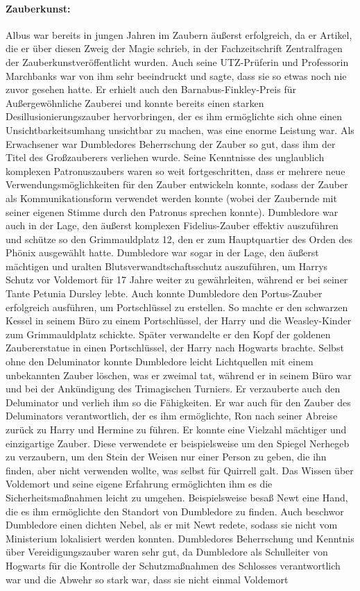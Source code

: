 \documentclass[a4paper, 10pt]{article}
\begin{document}
\paragraph{Zauberkunst:}
Albus war bereits in jungen Jahren im Zaubern äußerst erfolgreich, da er Artikel, die er über diesen Zweig der Magie schrieb, in der Fachzeitschrift Zentralfragen der Zauberkunstveröffentlicht wurden. Auch seine UTZ-Prüferin und Professorin Marchbanks war von ihm sehr beeindruckt und sagte, dass sie so etwas noch nie zuvor gesehen hatte. Er erhielt
auch den Barnabus-Finkley-Preis für Außergewöhnliche Zauberei und konnte bereits einen starken Desillusionierungszauber hervorbringen, der es ihm ermöglichte sich ohne einen Unsichtbarkeitsumhang unsichtbar zu machen, was eine enorme Leistung war. Als Erwachsener war Dumbledores Beherrschung der Zauber so gut, dass ihm der Titel des Großzauberers verliehen wurde. Seine Kenntnisse des unglaublich komplexen Patronuszaubers waren so weit fortgeschritten, dass er mehrere neue Verwendungsmöglichkeiten für den Zauber entwickeln konnte, sodass der Zauber als Kommunikationsform verwendet werden konnte (wobei der Zaubernde mit seiner eigenen Stimme durch den Patronus sprechen konnte). Dumbledore war auch in der Lage, den äußerst komplexen Fidelius-Zauber effektiv auszuführen und schütze so den Grimmauldplatz 12, den er zum Hauptquartier des Orden des Phönix ausgewählt hatte. Dumbledore war sogar in der Lage, den äußerst mächtigen und uralten Blutsverwandtschaftsschutz auszuführen, um Harrys Schutz vor Voldemort für 17 Jahre weiter zu gewährleiten, während er bei seiner Tante Petunia Dursley lebte. Auch konnte Dumbledore den Portus-Zauber erfolgreich ausführen, um Portschlüssel zu erstellen. So machte er den schwarzen Kessel in seinem Büro zu einem Portschlüssel, der Harry und die Weasley-Kinder zum Grimmauldplatz schickte. Später verwandelte er den Kopf der goldenen Zaubererstatue in einen Portschlüssel, der Harry nach Hogwarts brachte. Selbst ohne den Deluminator konnte Dumbledore leicht Lichtquellen mit einem unbekannten Zauber löschen, was er zweimal tat, während er in seinem Büro war und bei der Ankündigung des Trimagischen Turniers. Er verzauberte auch den Deluminator und verlieh ihm so die Fähigkeiten. Er war auch für den Zauber des Deluminators verantwortlich, der es ihm ermöglichte, Ron nach seiner Abreise zurück zu Harry und Hermine zu führen. Er konnte eine Vielzahl mächtiger und einzigartige Zauber. Diese verwendete er beispielsweise um den Spiegel Nerhegeb zu verzaubern, um den Stein der Weisen nur einer Person zu geben, die ihn finden, aber nicht verwenden wollte, was selbst für Quirrell galt. Das Wissen über Voldemort und seine eigene Erfahrung ermöglichten ihm es die Sicherheitsmaßnahmen leicht zu umgehen. Beispielsweise besaß Newt eine Hand, die es ihm ermöglichte den Standort von Dumbledore zu finden. Auch beschwor Dumbledore einen dichten Nebel, als er mit Newt redete, sodass sie nicht vom Ministerium lokalisiert werden konnten. Dumbledores Beherrschung und Kenntnis über Vereidigungszauber waren sehr gut, da Dumbledore als Schulleiter von Hogwarts für die Kontrolle der Schutzmaßnahmen des Schlosses verantwortlich war und die Abwehr so stark war, dass sie nicht einmal Voldemort 
\end{document}
